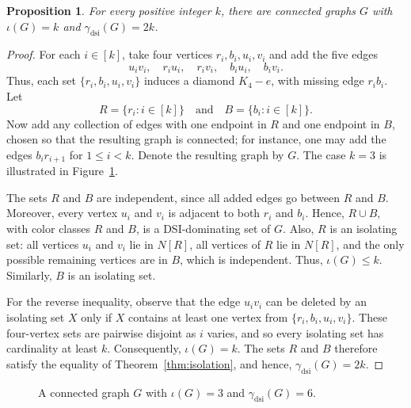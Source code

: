 \documentclass[11pt]{article}
\newtheorem{proposition}[theorem]{Proposition}
\theoremstyle{definition}
\theoremstyle{remark}
\newcommand{\dsi}{\mathrm{dsi}}
\newcommand{\iso}{\iota}
\begin{document}
\begin{proposition}
\label{prop:diamond-chain-equality}
For every positive integer \(k\), there are connected graphs \(G\) with
\(\iso(G)=k\) and \(\gamma_{\dsi}(G)=2k\).
\end{proposition}

\begin{proof}
For each \(i\in[k]\), take four vertices \(r_i,b_i,u_i,v_i\) and add the
five edges
\[
   u_iv_i,\quad r_iu_i,\quad r_iv_i,\quad b_iu_i,\quad b_iv_i.
\]
Thus, each set \(\{r_i,b_i,u_i,v_i\}\) induces a diamond \(K_4-e\), with
missing edge \(r_ib_i\). Let
\[
   R=\{r_i: i\in[k]\}\quad\text{and}\quad B=\{b_i: i\in[k]\}.
\]
Now add any collection of edges with one endpoint in \(R\) and one endpoint
in \(B\), chosen so that the resulting graph is connected; for instance, one
may add the edges \(b_ir_{i+1}\) for \(1\le i<k\). Denote the resulting graph
by \(G\). The case \(k=3\) is illustrated in
Figure~\ref{fig:diamond-chain-equality}.

The sets \(R\) and \(B\) are independent, since all added edges go between
\(R\) and \(B\). Moreover, every vertex \(u_i\) and \(v_i\) is adjacent to
both \(r_i\) and \(b_i\). Hence, \(R\cup B\), with color classes \(R\) and
\(B\), is a DSI-dominating set of \(G\). Also, \(R\) is an isolating set:
all vertices \(u_i\) and \(v_i\) lie in \(N[R]\), all vertices of \(R\) lie
in \(N[R]\), and the only possible remaining vertices are in \(B\), which is
independent. Thus, \(\iso(G)\le k\). Similarly, \(B\) is an isolating set.

For the reverse inequality, observe that the edge \(u_iv_i\) can be deleted
by an isolating set \(X\) only if \(X\) contains at least one vertex from
\(\{r_i,b_i,u_i,v_i\}\). These four-vertex sets are pairwise disjoint as
\(i\) varies, and so every isolating set has cardinality at least \(k\).
Consequently, \(\iso(G)=k\). The sets \(R\) and \(B\) therefore satisfy the
equality of Theorem~\ref{thm:isolation}, and hence,
\(\gamma_{\dsi}(G)=2k\).
\end{proof}

\begin{figure}[H]
\centering
{}
\caption{A connected graph $G$ with  \(\iso(G)=3\) and
\(\gamma_{\dsi}(G)=6\).}
\label{fig:diamond-chain-equality}
\end{figure}
\end{document}
